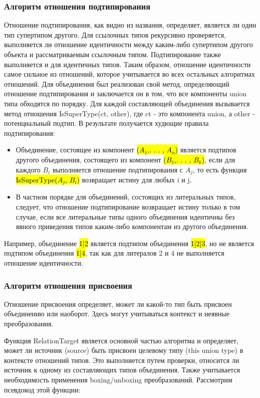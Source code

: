 \subsubsection{Алгоритм отношения подтипирования}

Отношение подтипирования, как видно из названия, определяет, является ли один тип супертипом другого.
Для ссылочных типов рекурсивно проверяется, выполняется ли отношение идентичности между каким-либо супертипом другого
объекта и рассматриваемым ссылочным типом.
Подтипирование также выполняется и для идентичных типов.
Таким образом, отношение идентичности самое сильное из отношений, которое учитывается во всех остальных алгоритмах
отношений.
Для объединения был реализован свой метод, определяющий отношение подтипирования и заключается он в том, что
все компоненты union типа обходятся по порядку.
Для каждой составляющей объединения вызывается метод отношения IsSuperType(ct, other), где ct - это компонента union, а
other - потенциальный подтип.
В результате получается худющие правила подтипирования:
\begin{itemize}
    \item Объединение, состоящее из компонент \hl{($A_1$,. . . , $A_n$)} является подтипов другого объединения, состоящего
    из компонент \hl{($B_1$,. . . , $B_k$)}, если для каждого $B_i$ выполняется отношение подтипирования с $A_j$, то
    есть функция \hl{IsSuperType($A_j$, $B_i$)} возвращает истину для любых i и j.
    \item В частном порядке для объединений, состоящих из литеральных типов, следует, что отношение подтипирование
    возвращает истину только в том случае, если все литеральные типы одного объединения идентичны без явного
    приведения типов каким-либо компонентам из другого объединения.
\end{itemize}
Например, объединение \hl{1|2} является подтипом объединения \hl{1|2|3}, но не является подтипом объединения \hl{1|4},
так как для литералов 2 и 4 не выполняется отношение идентичности.

\subsubsection{Алгоритм отношения присвоения}

Отношение присвоения определяет, может ли какой-то тип быть присвоен объединению или наоборот.
Здесь могут учитываться контекст и неявные преобразования.

Функция RelationTarget является основной частью алгоритма и определяет, может ли источник (source) быть присвоен целевому
типу (this union type) в контексте отношений типов.
Это выполняется путем проверки, относится ли источник к одному из составляющих типов объединения.
Также учитывается необходимость применения boxing/unboxing преобразований.
Рассмотрим псевдокод этой функции:


